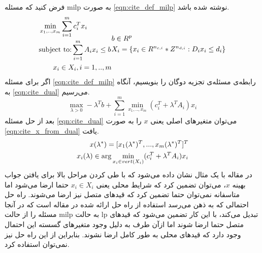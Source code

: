 	فرض کنید که مسئله milp به صورت \cref{eqn:cite_def_milp} نوشته شده باشد. 
	\begin{subequations}
		\begin{align}\label{eqn:cite_def_milp}
			&\min_{x_1,..,x_m} \sum_{i=1}^m c_i^Tx_i \notag \\
			&\text{subject to:} \sum_{i=1}^m A_ix_i \le b \notag \\
			&\quad\quad x_i \in X_i, i = 1,..,m
		\end{align}
		\begin{align}
			&b \in R^p \notag \\
			&X_i = \{x_i\in R^{n_{c,i}}*Z^{n_{d,i}}:D_ix_i \le d_i\}
		\end{align}
	\end{subequations}
	اگر برای مسئله \cref{eqn:cite_def_milp} رابطه‌ی مسئله‌ی تجزیه دوگان را بنویسیم، آنگاه به \cref{eqn:cite_dual}  می‌رسیم. 
	\begin{equation}\label{eqn:cite_dual}
		\max_{\lambda > 0} -\lambda^Tb + \sum_{i=1}^m \min_{x_1,..,x_m}(c_i^T + \lambda^TA_i)x_i
	\end{equation}
	بعد از حل مسئله \cref{eqn:cite_dual} می‌توان متغیرهای اصلی یعنی $x$ را به صورت \cref{eqn:cite_x_from_dual} یافت. 
	\begin{align}\label{eqn:cite_x_from_dual}
		x(\lambda^*) = [x_1(\lambda^*)^T, ..., x_m(\lambda^*)^T]^T \notag \\
		x_i(\lambda) \in \arg \min_{x_i \in vert(X_i)} (c_i^T + \lambda^TA_i)x_i
	\end{align}
	در مقاله \cite{decentralized_approach} با یک مثال نشان داده می‌شود که با طی کردن مراحل بالا برای یافتن جواب بهینه $x$، می‌توان تضمین کرد که شرایط محلی یعنی $x_i \in X_i$ حتما ارضا می‌شود اما متاسفانه نمی‌توان حتما تضمین کرد که قیدهای متصل نیز ارضا می‌شوند. راه حل احتمالی که به ذهن می‌رسد استفاده از راه حل ارائه شده در مقاله \cite{shor} است که در آنجا مسئله را از حالت milp به حالت lp تبدیل می‌کند، با این کار تضمین می‌شود که قیدهای متصل حتما ارضا شوند اما ازآن طرف به دلیل وجود متغیرهای گسسته این احتمال وجود دارد که قیدهای محلی به طور کامل ارضا نشوند. بنابراین از این راه حل نیز نمی‌توان استفاده کرد. 
	
